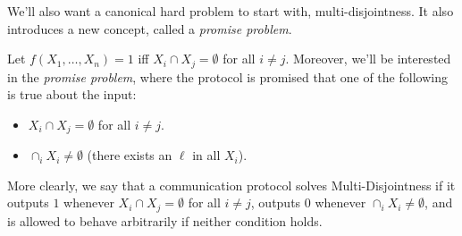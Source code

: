     We'll also want a canonical hard problem to start with, multi-disjointness. It
    also introduces a new concept, called a \emph{promise problem}.

    \begin{Exa} 
      Let $f(X_1,\ldots, X_n) = 1$ iff $X_i \cap X_j = \emptyset$
      for all $i \neq j$. Moreover, we'll be interested in the
      \emph{promise problem}, where the protocol is promised that one of the
      following is true about the input: 
      \begin{itemize} 
        \item $X_i \cap X_j =
        \emptyset$ for all $i \neq j$.  \item $\cap_i X_i \neq \emptyset$ (there
        exists an $\ell$ in all $X_i$).  
      \end{itemize}
      More clearly, we say that a
      communication protocol solves Multi-Disjointness if it outputs $1$ whenever $X_i
      \cap X_j = \emptyset$ for all $i \neq j$,
      outputs $0$ whenever $\cap_i X_i \neq \emptyset$,
      and is allowed to behave arbitrarily if neither condition holds.
    \end{Exa}

